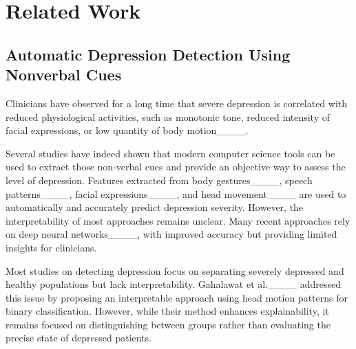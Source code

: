 \section{Related Work}

\subsection{Automatic Depression Detection Using Nonverbal Cues}

Clinicians have observed for a long time that severe depression is correlated with reduced physiological activities, such as monotonic tone, reduced intensity of facial expressions, or low quantity of body motion____.  

Several studies have indeed shown that modern computer science tools can be used to extract those non-verbal cues and provide an objective way to assess the level of depression. Features extracted from body gestures____, speech patterns____, facial expressions____, and head movement____ are used to automatically and accurately predict depression severity.
However, the interpretability of most approaches remains unclear. Many recent approaches rely on deep neural networks____, with improved accuracy but providing limited insights for clinicians.

Most studies on detecting depression focus on separating severely depressed and healthy populations but lack interpretability. Gahalawat et al.____ addressed this issue by proposing an interpretable approach using head motion patterns for binary classification. However, while their method enhances explainability, it remains focused on distinguishing between groups rather than evaluating the precise state of depressed patients.

